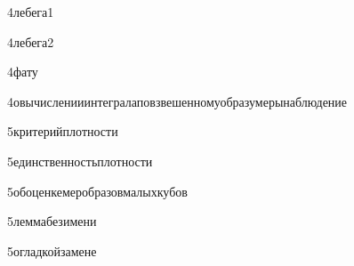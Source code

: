 {4}{лебега1}

{4}{лебега2}

{4}{фату}

{4}{овычисленииинтегралаповзвешенномуобразумерынаблюдение}

{5}{критерийплотности}

{5}{единственностьплотности}

{5}{обоценкемеробразовмалыхкубов}

{5}{леммабезимени}

{5}{огладкойзамене}

















